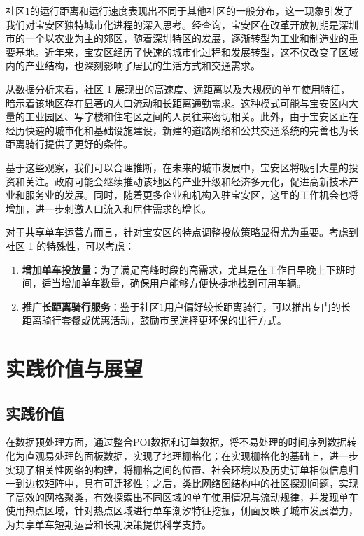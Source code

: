 \documentclass[12pt,a4paper,oneside]{ctexart}
\begin{document}
社区1的运行距离和运行速度表现出不同于其他社区的一般分布，这一现象引发了我们对宝安区独特城市化进程的深入思考。经查询，宝安区在改革开放初期是深圳市的一个以农业为主的郊区，随着深圳特区的发展，逐渐转型为工业和制造业的重要基地。近年来，宝安区经历了快速的城市化过程和发展转型，这不仅改变了区域内的产业结构，也深刻影响了居民的生活方式和交通需求。

从数据分析来看，社区 1 展现出的高速度、远距离以及大规模的单车使用特征，暗示着该地区存在显著的人口流动和长距离通勤需求。这种模式可能与宝安区内大量的工业园区、写字楼和住宅区之间的人员往来密切相关。此外，由于宝安区正在经历快速的城市化和基础设施建设，新建的道路网络和公共交通系统的完善也为长距离骑行提供了更好的条件。

基于这些观察，我们可以合理推断，在未来的城市发展中，宝安区将吸引大量的投资和关注。政府可能会继续推动该地区的产业升级和经济多元化，促进高新技术产业和服务业的发展。同时，随着更多企业和机构入驻宝安区，这里的工作机会也将增加，进一步刺激人口流入和居住需求的增长。

对于共享单车运营方而言，针对宝安区的特点调整投放策略显得尤为重要。考虑到社区 1 的特殊性，可以考虑：
\begin{enumerate}
    \item \textbf{增加单车投放量}：为了满足高峰时段的高需求，尤其是在工作日早晚上下班时间，适当增加单车数量，确保用户能够方便快捷地找到可用车辆。
    \item \textbf{推广长距离骑行服务}：鉴于社区1用户偏好较长距离骑行，可以推出专门的长距离骑行套餐或优惠活动，鼓励市民选择更环保的出行方式。
\end{enumerate}

\section{实践价值与展望}

\subsection{实践价值}

在数据预处理方面，通过整合POI数据和订单数据，将不易处理的时间序列数据转化为直观易处理的面板数据，实现了地理栅格化；在实现栅格化的基础上，进一步实现了相关性网络的构建，将栅格之间的位置、社会环境以及历史订单相似信息归一到边权矩阵中，具有可迁移性；之后，类比网络图结构中的社区探测问题，实现了高效的网格聚类，有效探索出不同区域的单车使用情况与流动规律，并发现单车使用热点区域，针对热点区域进行单车潮汐特征挖掘，侧面反映了城市发展潜力，为共享单车短期运营和长期决策提供科学支持。
\end{document}
